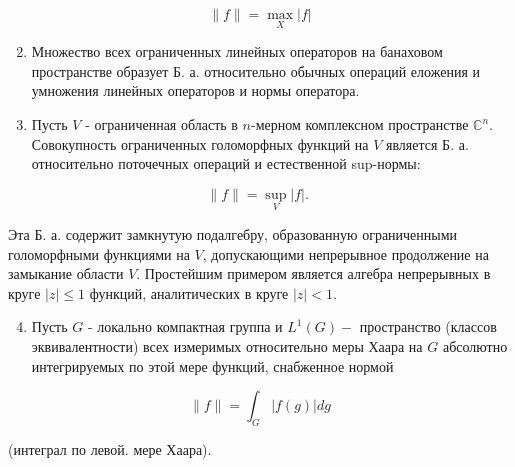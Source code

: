\documentclass[10pt]{article}
\begin{document}
\[

\|f\|=\underset{X}{\max }|f|

\]



\begin{enumerate}

  \setcounter{enumi}{1}

  \item Множество всех ограниченных линейных операторов на банаховом пространстве образует Б. а. относительно обычных операций еложения и умножения линейных операторов и нормы оператора.



  \item Пусть $V$ - ограниченная область в $n$-мерном комплексном пространстве $\mathbb{C}^{n}$. Совокупность ограниченных голоморфных функций на $V$ является Б. а. относительно поточечных операций и естественной sup-нормы:



\end{enumerate}



\[

\|f\|=\sup _{V}|f| \text {. }

\]



Эта Б. а. содержит замкнутую подалгебру, образованную ограниченными голоморфными функциями на $V$, допускающими непрерывное продолжение на замыкание области $V$. Простейшим примером является алгебра непрерывных в круге $|z| \leqslant 1$ функций, аналитических в круге $|z|<1$.



\begin{enumerate}

  \setcounter{enumi}{3}

  \item Пусть $G$ - локально компактная группа и $L^{1}(G)-$ пространство (классов эквивалентности) всех измеримых относительно меры Хаара на $G$ абсолютно интегрируемых по этой мере функций, снабженное нормой

\end{enumerate}



\[

\|f\|=\int_{G}|f(g)| d g

\]



(интеграл по левой. мере Хаара).
\end{document}
